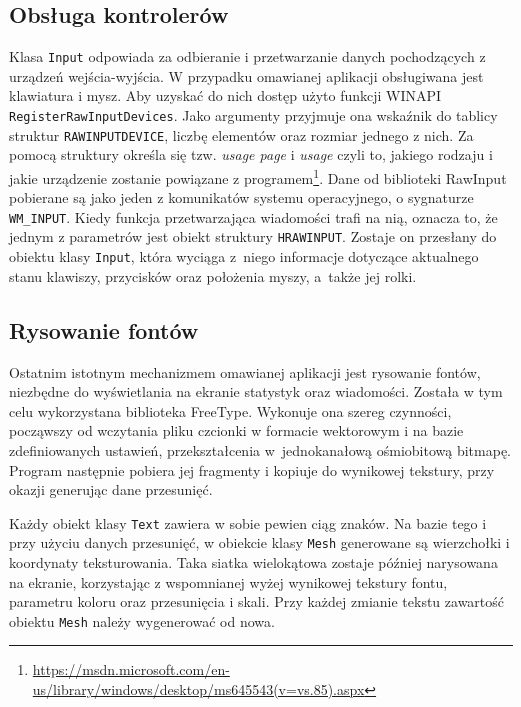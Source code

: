 		\subsection{Obsługa kontrolerów}
		\label{t:budowa:inne:input}
		
		
		Klasa \texttt{Input} odpowiada za odbieranie i przetwarzanie danych pochodzących z urządzeń wejścia-wyjścia. W przypadku omawianej aplikacji obsługiwana jest klawiatura i mysz. Aby uzyskać do nich dostęp użyto funkcji WINAPI \texttt{RegisterRawInputDevices}. Jako argumenty przyjmuje ona wskaźnik do tablicy struktur \texttt{RAWINPUTDEVICE}, liczbę elementów oraz rozmiar jednego z nich. Za pomocą struktury określa się tzw. \emph{usage page} i \emph{usage} czyli to, jakiego rodzaju i jakie urządzenie zostanie powiązane z programem\footnote{\url{https://msdn.microsoft.com/en-us/library/windows/desktop/ms645543(v=vs.85).aspx}}. 
		Dane od biblioteki RawInput pobierane są jako jeden z komunikatów systemu operacyjnego, o sygnaturze \texttt{WM\_INPUT}. Kiedy funkcja przetwarzająca wiadomości trafi na nią, oznacza to, że jednym z parametrów jest obiekt struktury \texttt{HRAWINPUT}. Zostaje on przesłany do obiektu klasy \texttt{Input}, która wyciąga z~niego informacje dotyczące aktualnego stanu klawiszy, przycisków oraz położenia myszy, a~także jej rolki.
		
		\subsection{Rysowanie fontów}
		\label{t:budowa:inne:fonty}
		
		
		Ostatnim istotnym mechanizmem omawianej aplikacji jest rysowanie fontów, niezbędne do wyświetlania na ekranie statystyk oraz wiadomości. Została w tym celu wykorzystana biblioteka FreeType. Wykonuje ona szereg czynności, począwszy od wczytania pliku czcionki w formacie wektorowym i na bazie zdefiniowanych ustawień, przekształcenia w~jednokanałową ośmiobitową bitmapę. Program następnie pobiera jej fragmenty i kopiuje do wynikowej tekstury, przy okazji generując dane przesunięć.
		
		Każdy obiekt klasy \texttt{Text} zawiera w sobie pewien ciąg znaków. Na bazie tego i przy użyciu danych przesunięć, w obiekcie klasy \texttt{Mesh} generowane są wierzchołki i koordynaty teksturowania. Taka siatka wielokątowa zostaje później narysowana na ekranie, korzystając z wspomnianej wyżej wynikowej tekstury fontu, parametru koloru oraz przesunięcia i skali. Przy każdej zmianie tekstu zawartość obiektu \texttt{Mesh} należy wygenerować od nowa.